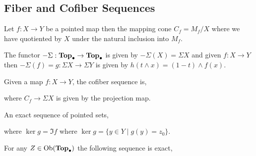 \documentclass[12pt]{extarticle}
\begin{document}
\subsection{Fiber and Cofiber Sequences}

\begin{definition}
Let $f : X \to Y$ be a pointed map then the mapping cone $C_f = M_f / X$ where we have quotiented by $X$ under the natural inclusion into $M_f$.
\end{definition}

\begin{definition}
The functor $-\Sigma : \mathbf{Top}_{\bullet} \to \mathbf{Top}_{\bullet}$ is given by $-\Sigma (X) = \Sigma X$ and given $f : X \to Y$ then $- \Sigma (f) = g : \Sigma X \to \Sigma Y$ is given by $h(t \wedge x) = (1 - t) \wedge f(x)$. 
\end{definition}

\begin{definition}
Given a map $f : X \to Y$, the cofiber sequence is,
\begin{center}
\end{center}  
where $C_f \to \Sigma X$ is given by the projection map.
\end{definition}

\begin{definition}
An exact sequence of pointed sets,
\begin{center}
\end{center} 
where $\ker{g} = \Im{f}$ where $\ker{g} = \{y \in Y \mid g(y) = z_0\}$.
\end{definition}

\begin{theorem}
For any $Z \in \mathrm{Ob}(\mathbf{Top}_{\bullet})$ the following sequence is exact,
\begin{center}
\end{center}  
\end{theorem}
\end{document}

